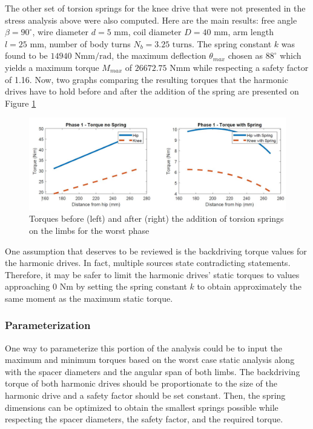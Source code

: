 The other set of torsion springs for the knee drive that were not presented in the stress analysis above were also computed. Here are the main results: free angle $\beta = 90^{\circ}$, wire diameter $d = 5\text{ mm}$, coil diameter $D = 40\text{ mm}$, arm length $l = 25\text{ mm}$, number of body turns $N_b = 3.25\text{ turns}$. The spring constant $k$ was found to be $14940\text{ Nmm/rad}$, the maximum deflection $\theta_{max}$ chosen as $88^{\circ}$ which yields a maximum torque $M_{max}$ of $26672.75\text{ Nmm}$ while respecting a safety factor of 1.16. Now, two graphs comparing the resulting torques that the harmonic drives have to hold before and after the addition of the spring are presented on Figure \ref{fig:TorqueB4&after}

\begin{figure}
    \centering
    \includegraphics[width=\textwidth]{4_Analysis/img/Spring/SpringVSNoSpring.JPG}
    \caption{Torques before (left) and after (right) the addition of torsion springs on the limbs for the worst phase}
    \label{fig:TorqueB4&after}
\end{figure}

One assumption that deserves to be reviewed is the backdriving torque values for the harmonic drives. In fact, multiple sources state contradicting statements. Therefore, it may be safer to limit the harmonic drives' static torques to values approaching $0 \text{ Nm}$ by setting the spring constant $k$ to obtain approximately the same moment as the maximum static torque.
\subsubsection{Parameterization}
One way to parameterize this portion of the analysis could be to input the maximum and minimum torques based on the worst case static analysis along with the spacer diameters and the angular span of both limbs. The backdriving torque of both harmonic drives should be proportionate to the size of the harmonic drive and a safety factor should be set constant. Then, the spring dimensions can be optimized to obtain the smallest springs possible while respecting the spacer diameters, the safety factor, and the required torque.